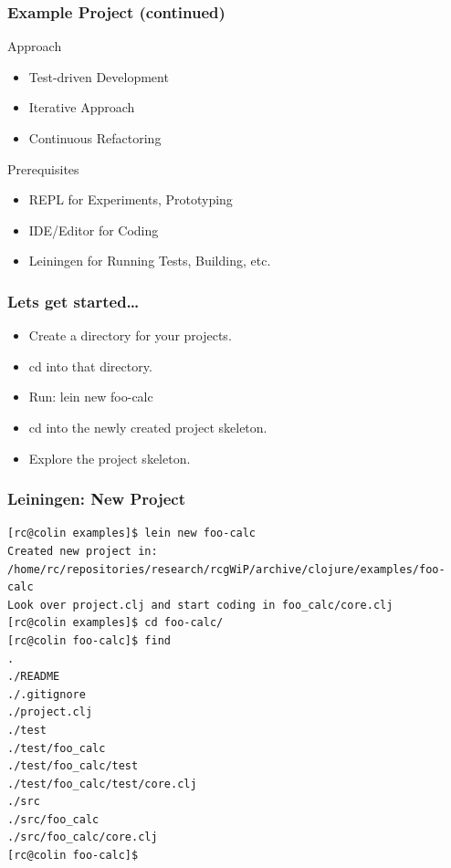 \documentclass{beamer}
\begin{document}
  \begin{frame}
    \frametitle{Example Project (continued)}
    \begin{block}{Approach}
        \begin{itemize}
          \item Test-driven Development
          \item Iterative Approach
          \item Continuous Refactoring
        \end{itemize}
    \end{block}
    \begin{block}{Prerequisites}
        \begin{itemize}
          \item REPL for Experiments, Prototyping
          \item IDE/Editor for Coding
          \item Leiningen for Running Tests, Building, etc.
        \end{itemize}
    \end{block}
  \end{frame}

  \begin{frame}
    \frametitle{Lets get started\ldots}
    \begin{itemize}
      \item Create a directory for your projects.
      \item cd into that directory.
      \item Run: lein new foo-calc
      \item cd into the newly created project skeleton.
      \item Explore the project skeleton.
    \end{itemize}
  \end{frame}

\begin{frame}[fragile]
\frametitle{Leiningen: New Project}
\begin{lstlisting}[basicstyle=\scriptsize]
[rc@colin examples]$ lein new foo-calc 
Created new project in: /home/rc/repositories/research/rcgWiP/archive/clojure/examples/foo-calc
Look over project.clj and start coding in foo_calc/core.clj
[rc@colin examples]$ cd foo-calc/ 
[rc@colin foo-calc]$ find 
.
./README
./.gitignore
./project.clj
./test
./test/foo_calc
./test/foo_calc/test
./test/foo_calc/test/core.clj
./src
./src/foo_calc
./src/foo_calc/core.clj
[rc@colin foo-calc]$  
\end{lstlisting}
\end{frame}
\end{document}
